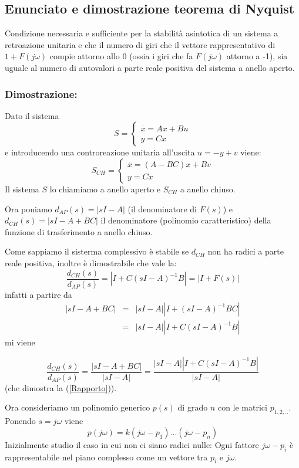 \documentclass{article}
\begin{document}
\subsection{Enunciato e dimostrazione teorema di Nyquist}
Condizione necessaria e sufficiente per la stabilità asintotica di un sistema a retroazione unitaria e che il numero di 
giri che il vettore rappresentativo di $1+F(j\omega)$ compie attorno allo 0 (ossia i giri che fa $F(j\omega)$ attorno a -1),
sia uguale al numero di autovalori a parte reale positiva del sistema a anello aperto.

\subsubsection{Dimostrazione:}
Dato il sistema 
\[S = \begin{cases} \overset{\cdot}{x} = Ax+Bu\\ y = Cx \end{cases}\]
e introducendo una controreazione unitaria all'uscita $u = -y +v$ viene:
\[S_{CH} = \begin{cases} \overset{\cdot}{x} = (A-BC)x+Bv\\ y = Cx \end{cases}\]
Il sistema $S$ lo chiamiamo a anello aperto e $S_{CH}$ a anello chiuso.

Ora poniamo $d_{AP}(s) = |sI-A|$ (il denominatore di $F(s)$) e $d_{CH}(s) = |sI-A+BC|$ il denominatore
(polinomio caratteristico)
della funzione di trasferimento a anello chiuso.

Come sappiamo il sisterma complessivo è stabile se $d_{CH}$ non ha radici a parte reale positiva,
inoltre è dimostrabile che vale la:
\begin{equation}\label{Rapporto}
  \frac{d_{CH}(s)}{d_{AP}(s)} =   |I +C(sI - A)^{-1}B| = |I+F(s)|
\end{equation}
infatti a partire da 
\begin{align*}
    |sI-A+BC| &=& |sI-A||I +(sI - A)^{-1}BC|\\
                &=&|sI-A||I +C(sI - A)^{-1}B|
\end{align*}
mi viene

\[
    \frac{d_{CH}(s)}{d_{AP}(s)}    = \frac{|sI-A+BC|}{|sI-A|} = \frac{|sI-A||I +C(sI - A)^{-1}B|}{|sI-A|}
\]
(che dimostra la (\ref{Rapporto})).

Ora consideriamo un polinomio generico $p(s)$ di grado $n$ con le matrici $p_{1,2,..}$.
Ponendo $s = j\omega$ viene 
\[ 
    p(j\omega) = {k(j\omega-p_1)...(j\omega - p_n)}
\]
Inizialmente studio il caso in cui non ci siano radici nulle:
Ogni fattore $j\omega - p_i$ è rappresentabile nel piano complesso come un vettore tra $p_i$ e $j\omega$.
\end{document}
